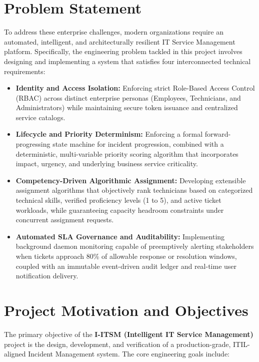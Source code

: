 \documentclass[11pt,a4paper,oneside]{report}
\begin{document}
\section{Problem Statement}
\label{sec:intro_problem}
To address these enterprise challenges, modern organizations require an automated, intelligent, and architecturally resilient IT Service Management platform. Specifically, the engineering problem tackled in this project involves designing and implementing a system that satisfies four interconnected technical requirements:
\begin{itemize}
    \item \textbf{Identity and Access Isolation:} Enforcing strict Role-Based Access Control (RBAC) across distinct enterprise personas (Employees, Technicians, and Administrators) while maintaining secure token issuance and centralized service catalogs.
    \item \textbf{Lifecycle and Priority Determinism:} Enforcing a formal forward-progressing state machine for incident progression, combined with a deterministic, multi-variable priority scoring algorithm that incorporates impact, urgency, and underlying business service criticality.
    \item \textbf{Competency-Driven Algorithmic Assignment:} Developing extensible assignment algorithms that objectively rank technicians based on categorized technical skills, verified proficiency levels (1 to 5), and active ticket workloads, while guaranteeing capacity headroom constraints under concurrent assignment requests.
    \item \textbf{Automated SLA Governance and Auditability:} Implementing background daemon monitoring capable of preemptively alerting stakeholders when tickets approach 80\% of allowable response or resolution windows, coupled with an immutable event-driven audit ledger and real-time user notification delivery.
\end{itemize}

\section{Project Motivation and Objectives}
\label{sec:intro_objectives}
The primary objective of the \textbf{I-ITSM (Intelligent IT Service Management)} project is the design, development, and verification of a production-grade, ITIL-aligned Incident Management system. The core engineering goals include:
\end{document}
